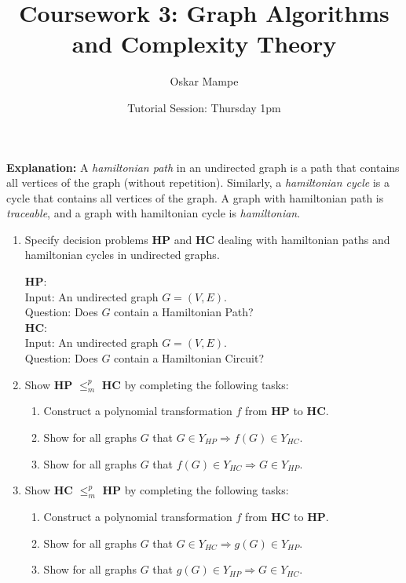 \documentclass[11pt,a4paper]{article}
\title{Coursework 3: Graph Algorithms and Complexity Theory}
\author{Oskar Mampe}
\date{Tutorial Session: Thursday 1pm}
\begin{document}
\maketitle
\thispagestyle{empty}

\textbf{Explanation: } A \textit{hamiltonian path} in an undirected graph is a path that contains all vertices of the graph (without repetition).  Similarly, a \textit{hamiltonian cycle} is a cycle that contains all vertices of the graph.  A graph with hamiltonian path is \textit{traceable}, and a graph with hamiltonian cycle is \textit{hamiltonian}.

\begin{enumerate}
    \item Specify decision problems \textbf{HP} and \textbf{HC} dealing with hamiltonian paths and hamiltonian cycles in undirected graphs.
    
    \textbf{HP}:\\ Input: An undirected graph $G = (V, E)$.\\ Question: Does $G$ contain a Hamiltonian Path?\\


    \textbf{HC}:\\ Input: An undirected graph $G = (V, E)$.\\ Question: Does $G$ contain a Hamiltonian Circuit?\\

    \item Show \textbf{HP} $\leq^p_m$ \textbf{HC} by completing the following tasks: 
        \begin{enumerate}
            \item Construct a polynomial transformation $f$ from \textbf{HP} to \textbf{HC}.
            \item Show for all graphs $G$ that $G \in Y_{HP} \Rightarrow f(G) \in Y_{HC}$. 
            \item Show for all graphs $G$ that $f(G) \in Y_{HC} \Rightarrow G \in Y_{HP}$.
        \end{enumerate}
    \item Show \textbf{HC} $\leq^p_m$ \textbf{HP} by completing the following tasks: 
    \begin{enumerate}
        \item Construct a polynomial transformation $f$ from \textbf{HC} to \textbf{HP}.
        \item Show for all graphs $G$ that $G \in Y_{HC} \Rightarrow g(G) \in Y_{HP}$.
        \item Show for all graphs $G$ that $g(G) \in Y_{HP} \Rightarrow G \in Y_{HC}$.
    \end{enumerate}
\end{enumerate}
\end{document}

